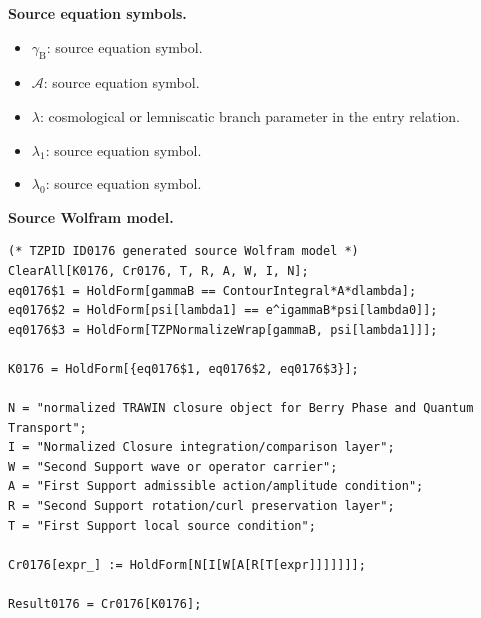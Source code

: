 \begin{minipage}[t]{0.49\linewidth}
\begingroup
\small
\raggedright
\textbf{Source equation symbols.}\par
\begin{itemize}[leftmargin=1.35em,itemsep=1pt,topsep=1pt,parsep=0pt]
    \item $\gamma_{\mathrm{B}}$: source equation symbol.
    \item $\mathcal{A}$: source equation symbol.
    \item $\lambda$: cosmological or lemniscatic branch parameter in the entry relation.
    \item $\lambda_1$: source equation symbol.
    \item $\lambda_0$: source equation symbol.
\end{itemize}
\endgroup
\end{minipage}\hfill
\begin{minipage}[t]{0.47\linewidth}
\begingroup
\scriptsize
\raggedright
\textbf{Source Wolfram model.}\par
\begin{Verbatim}[fontsize=\tiny,breaklines=true,breakanywhere=true]
(* TZPID ID0176 generated source Wolfram model *)
ClearAll[K0176, Cr0176, T, R, A, W, I, N];
eq0176$1 = HoldForm[gammaB == ContourIntegral*A*dlambda];
eq0176$2 = HoldForm[psi[lambda1] == e^igammaB*psi[lambda0]];
eq0176$3 = HoldForm[TZPNormalizeWrap[gammaB, psi[lambda1]]];

K0176 = HoldForm[{eq0176$1, eq0176$2, eq0176$3}];

N = "normalized TRAWIN closure object for Berry Phase and Quantum Transport";
I = "Normalized Closure integration/comparison layer";
W = "Second Support wave or operator carrier";
A = "First Support admissible action/amplitude condition";
R = "Second Support rotation/curl preservation layer";
T = "First Support local source condition";

Cr0176[expr_] := HoldForm[N[I[W[A[R[T[expr]]]]]]];

Result0176 = Cr0176[K0176];
\end{Verbatim}
\endgroup
\end{minipage}


